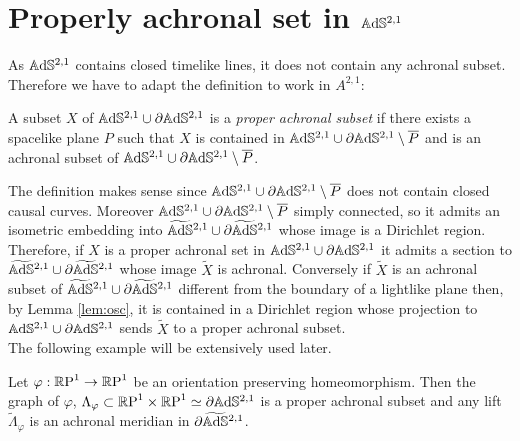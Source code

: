 \section{Properly achronal set in $\A^{2,1}$}
As $\A^{2,1}$ contains closed timelike lines, it does not contain any achronal subset. Therefore we have to adapt the definition to work in $A^{2,1}$:
\begin{definition}
    A subset $X$ of $\A^{2,1} \cup \partial\A^{2,1}$ is a \textit{proper achronal subset} if there exists a spacelike plane $P$ such that $X$ is contained in $\A^{2,1} \cup \partial\A^{2,1} \setminus \overline{P}$ and is an achronal subset of $\A^{2,1} \cup \partial\A^{2,1} \setminus \overline{P}$.
\end{definition}
The definition makes sense since $\A^{2,1} \cup \partial\A^{2,1} \setminus \overline{P}$ does not contain closed causal curves. Moreover $\A^{2,1} \cup \partial\A^{2,1} \setminus \overline{P}$ simply connected, so it admits an isometric embedding into $\AS^{2,1} \cup \partial\AS^{2,1}$ whose image is a Dirichlet region. Therefore, if $X$ is a proper achronal set in $\A^{2,1} \cup \partial\A^{2,1}$ it admits a section to $\AS^{2,1} \cup \partial\AS^{2,1}$ whose image $\widetilde{X}$ is achronal. Conversely if $\widetilde{X}$ is an achronal subset of $\AS^{2,1} \cup \partial\AS^{2,1}$ different from the boundary of a lightlike plane then, by Lemma \ref{lem:osc}, it is contained in a Dirichlet region whose projection to $\A^{2,1} \cup \partial\A^{2,1}$ sends $\widetilde{X}$ to a proper achronal subset.\\
The following example will be extensively used later.
\begin{lemma}
    Let $\varphi: \S \to \S$ be an orientation preserving homeomorphism. Then the graph of $\varphi$, $\Lambda_\varphi \subset \T \simeq \partial\A^{2,1}$ is a proper achronal subset and any lift $\widetilde{\Lambda}_\varphi$ is an achronal meridian in $\partial\AS^{2,1}$.
\end{lemma}
